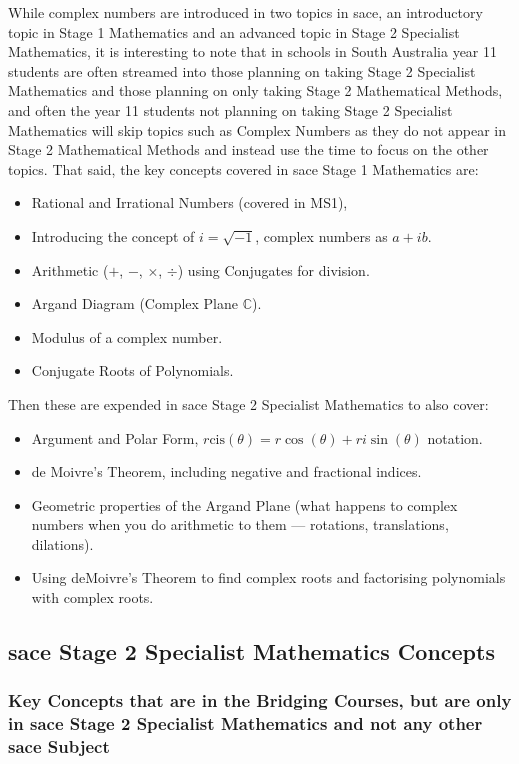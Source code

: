 \documentclass[twoside,12pt,a4paper]{report}
\begin{document}
While complex numbers are introduced in two topics in \gls{sace}, an introductory topic in Stage 1 Mathematics and an advanced topic in Stage 2 Specialist Mathematics, it is interesting to note that in schools in South Australia year 11 students are often streamed into those planning on taking Stage 2 Specialist Mathematics and those planning on only taking Stage 2 Mathematical Methods, and often the year 11 students not planning on taking Stage 2 Specialist Mathematics will skip topics such as Complex Numbers as they do not appear in Stage 2 Mathematical Methods and instead use the time to focus on the other topics. That said, the key concepts covered in \gls{sace} Stage 1 Mathematics are:
\begin{itemize}
	\item Rational and Irrational Numbers (covered in MS1), 
	\item Introducing the concept of $i = \sqrt{-1}$, complex numbers as $a + ib$.
	\item Arithmetic ($+$, $-$, $\times$, $\div$) using Conjugates for division.
	\item Argand Diagram (Complex Plane $\mathbb{C}$).
	\item Modulus of a complex number.
	\item Conjugate Roots of Polynomials.
\end{itemize}
Then these are expended in \gls{sace} Stage 2 Specialist Mathematics to also cover:
\begin{itemize}
	\item Argument and Polar Form, $r\text{cis}(\theta) = r\cos(\theta) + ri\sin(\theta)$ notation.
	\item de Moivre's Theorem, including negative and fractional indices.
	\item Geometric properties of the Argand Plane (what happens to complex numbers when you do arithmetic to them --- rotations, translations, dilations).
	\item Using deMoivre's Theorem to find complex roots and factorising polynomials with complex roots.
\end{itemize}


\subsection{\gls{sace} Stage 2 Specialist Mathematics Concepts}

\subsubsection{Key Concepts that are in the Bridging Courses, but are only in \gls{sace} Stage 2 Specialist Mathematics and not any other \gls{sace} Subject}
\end{document}
